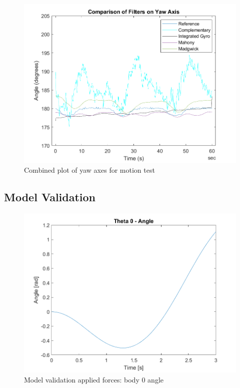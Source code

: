 \begin{figure}[H]
    \centering
    \includegraphics[scale=1]{graphics/Navigation/CombinedMotionYaw.png}
    \caption{Combined plot of yaw axes for motion test}
     \label{fig:Combined plot of yaw axes for motion test}
\end{figure}

\subsection{Model Validation}


\begin{figure}[H]
  \centering
  \includegraphics[scale=1]{graphics/Integration/theta0.png}
  \caption{Model validation applied forces: body 0 angle}
  \label{fig:Model validation applied forces: body 0 angular position}
\end{figure}


